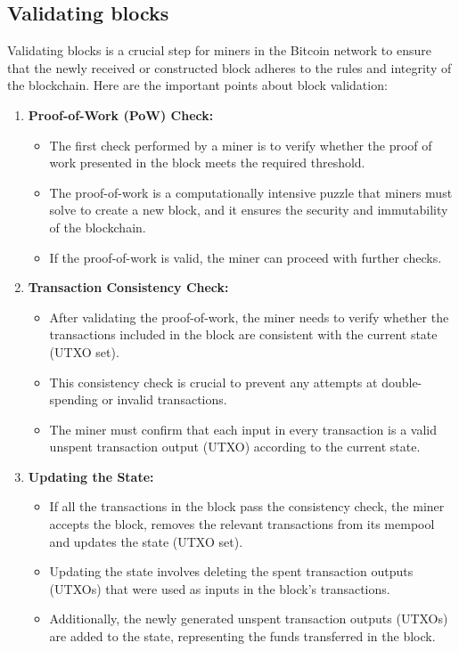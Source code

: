 \subsection{Validating blocks}
Validating blocks is a crucial step for miners in the Bitcoin network to ensure that the newly received or constructed block adheres to the rules and integrity of the blockchain. Here are the important points about block validation:

\begin{enumerate}
    \item \textbf{Proof-of-Work (PoW) Check:}
    \begin{itemize}
        \item The first check performed by a miner is to verify whether the proof of work presented in the block meets the required threshold.
        \item The proof-of-work is a computationally intensive puzzle that miners must solve to create a new block, and it ensures the security and immutability of the blockchain.
        \item If the proof-of-work is valid, the miner can proceed with further checks.
    \end{itemize}
    \item \textbf{Transaction Consistency Check:}
    \begin{itemize}
        \item After validating the proof-of-work, the miner needs to verify whether the transactions included in the block are consistent with the current state (UTXO set).
        \item This consistency check is crucial to prevent any attempts at double-spending or invalid transactions.
        \item The miner must confirm that each input in every transaction is a valid unspent transaction output (UTXO) according to the current state.
    \end{itemize}
    \item \textbf{Updating the State:}
    \begin{itemize}
        \item If all the transactions in the block pass the consistency check, the miner accepts the block, removes the relevant transactions from its mempool and updates the state (UTXO set).
        \item Updating the state involves deleting the spent transaction outputs (UTXOs) that were used as inputs in the block's transactions.
        \item Additionally, the newly generated unspent transaction outputs (UTXOs) are added to the state, representing the funds transferred in the block.

\end{itemize}
\end{enumerate}
